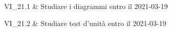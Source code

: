 VI\_21.1 & Studiare i diagrammi entro il 2021-03-19

\tabularnewline
VI\_21.2 & Studiare test d'unità entro il 2021-03-19

